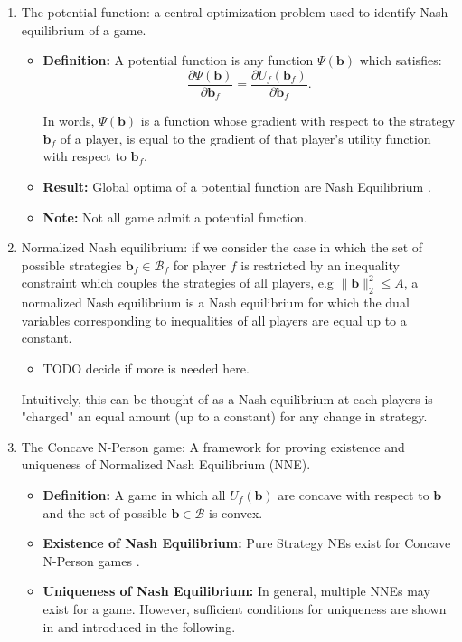 \documentclass[12pt,a4paper]{report}
\begin{document}
\begin{enumerate}
\item The potential function: a central optimization problem used to identify Nash equilibrium of a game.
\begin{itemize}
\item
\textbf{Definition:}  A potential function is any function
$ \Psi(\mathbf{b})$ which satisfies:
\begin{equation}\label{potential_game_condition}
\frac{\partial \Psi(\mathbf{b})}{\partial \mathbf{b}_{f}}
 =
 \frac{\partial U_f(\mathbf{b}_{f})}{\partial \mathbf{b}_{f}}.
\end{equation} 

In words, $ \Psi(\mathbf{b})$ is a function whose gradient with respect to the strategy $\mathbf{b}_{f}$ of a player, is equal to the gradient of that player's utility function with respect to $\mathbf{b}_{f}$.

\item \textbf{Result:} Global optima of a potential function are Nash Equilibrium \cite{monderer1996potential}.
\item \textbf{Note:} Not all game admit a potential function.


\end{itemize}

\item Normalized Nash equilibrium:  if we consider the case in which the set of possible strategies $\mathbf{b}_{f} \in \mathcal{B}_f$ for player $f$ is restricted by an inequality constraint which couples the strategies of all players, e.g $\|\textbf{b}\|_2^2 \leq A$, a normalized Nash equilibrium is a Nash equilibrium for which the dual variables corresponding to inequalities of all players are equal up to a constant.
\begin{itemize}
\item TODO decide if more is needed here. 
\end{itemize}
Intuitively, this can be thought of as a Nash equilibrium at each players is "charged" an equal amount (up to a constant) for any change in strategy.

\item The Concave N-Person game: A framework for proving existence and uniqueness of Normalized Nash Equilibrium (NNE).

\begin{itemize}
\item
\textbf{Definition:} A game in which all $U_f(\mathbf{b})$ are concave with respect to $\mathbf{b}$ and the set of possible $\textbf{b}\in\mathcal{B}$ is convex. 
\item 
\textbf{Existence of Nash Equilibrium:} Pure Strategy NEs exist for Concave N-Person games \cite[Thm1]{rosen1964existence}. 
\item
\textbf{Uniqueness of Nash Equilibrium:} In general, multiple NNEs may exist for a game. However, sufficient conditions for uniqueness are shown in \cite[Thm4]{rosen1964existence} and introduced in the following. 


\end{itemize}
\end{enumerate}
\end{document}
